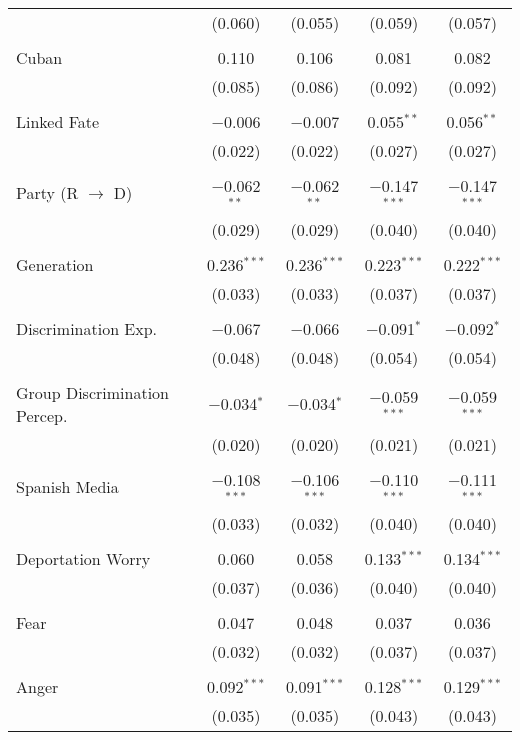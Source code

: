 \begin{table}[!htbp]
\begin{tabular}{@{\extracolsep{5pt}}lcccc}
  & (0.060) & (0.055) & (0.059) & (0.057) \\ 
  & & & & \\ 
 Cuban & 0.110 & 0.106 & 0.081 & 0.082 \\ 
  & (0.085) & (0.086) & (0.092) & (0.092) \\ 
  & & & & \\ 
 Linked Fate & $-$0.006 & $-$0.007 & 0.055$^{**}$ & 0.056$^{**}$ \\ 
  & (0.022) & (0.022) & (0.027) & (0.027) \\ 
  & & & & \\ 
 Party (R $\longrightarrow$ D) & $-$0.062$^{**}$ & $-$0.062$^{**}$ & $-$0.147$^{***}$ & $-$0.147$^{***}$ \\ 
  & (0.029) & (0.029) & (0.040) & (0.040) \\ 
  & & & & \\ 
 Generation & 0.236$^{***}$ & 0.236$^{***}$ & 0.223$^{***}$ & 0.222$^{***}$ \\ 
  & (0.033) & (0.033) & (0.037) & (0.037) \\ 
  & & & & \\ 
 Discrimination Exp. & $-$0.067 & $-$0.066 & $-$0.091$^{*}$ & $-$0.092$^{*}$ \\ 
  & (0.048) & (0.048) & (0.054) & (0.054) \\ 
  & & & & \\ 
 Group Discrimination Percep. & $-$0.034$^{*}$ & $-$0.034$^{*}$ & $-$0.059$^{***}$ & $-$0.059$^{***}$ \\ 
  & (0.020) & (0.020) & (0.021) & (0.021) \\ 
  & & & & \\ 
 Spanish Media & $-$0.108$^{***}$ & $-$0.106$^{***}$ & $-$0.110$^{***}$ & $-$0.111$^{***}$ \\ 
  & (0.033) & (0.032) & (0.040) & (0.040) \\ 
  & & & & \\ 
 Deportation Worry & 0.060 & 0.058 & 0.133$^{***}$ & 0.134$^{***}$ \\ 
  & (0.037) & (0.036) & (0.040) & (0.040) \\ 
  & & & & \\ 
 Fear & 0.047 & 0.048 & 0.037 & 0.036 \\ 
  & (0.032) & (0.032) & (0.037) & (0.037) \\ 
  & & & & \\ 
 Anger & 0.092$^{***}$ & 0.091$^{***}$ & 0.128$^{***}$ & 0.129$^{***}$ \\ 
  & (0.035) & (0.035) & (0.043) & (0.043) \\ 

\end{tabular}
\end{table}
